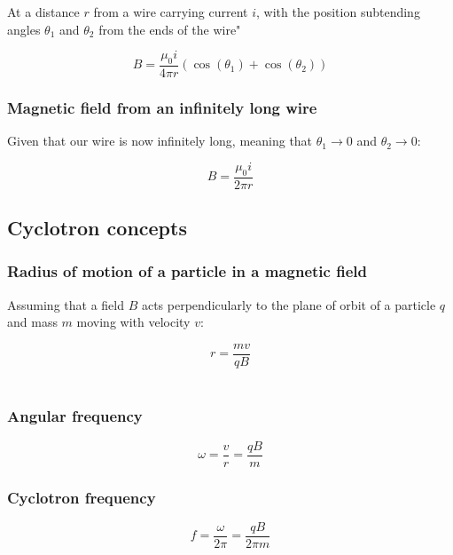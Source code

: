 \documentclass[12pt]{article}
\begin{document}
At a distance $r$ from a wire carrying current $i$, with the position subtending angles $\theta_1$ and $\theta_2$ from the ends of the wire"

\[
\boxed{
B = \frac{\mu_0 i}{4\pi r}\left(\cos(\theta_1) + \cos(\theta_2)\right)
}
\]

\subsubsection{Magnetic field from an infinitely long wire}

Given that our wire is now infinitely long, meaning that $\theta_1 \longrightarrow 0$ and $\theta_2 \longrightarrow 0$:

\[
\boxed{
B = \frac{\mu_0 i}{2\pi r}
}
\]

\subsection{Cyclotron concepts}

\subsubsection{Radius of motion of a particle in a magnetic field}

Assuming that a field $B$ acts perpendicularly to the plane of orbit of a particle $q$ and mass $m$ moving with velocity $v$:

\[
\boxed{
r = \frac{mv}{qB}
}
\]\\

\begin{multicols}{2}

\subsubsection{Angular frequency}

\[
\boxed{
\omega = \frac{v}{r}=\frac{qB}{m}
}
\]

\columnbreak

\subsubsection{Cyclotron frequency}

\[
\boxed{
f = \frac{\omega}{2\pi}=\frac{qB}{2\pi m}
}
\]

\end{multicols}

\end{document}
